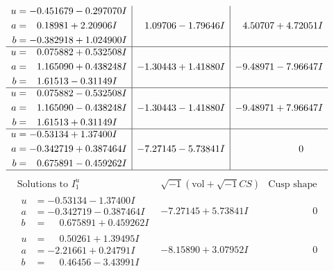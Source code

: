 \documentclass[1p]{elsarticle_modified}
\theoremstyle{definition}
\newcommand{\I}{\sqrt{-1}}
\begin{document}
$$\begin{array}{c|c|c}
\begin{aligned}
u &= -0.451679 - 0.297070 I \\
a &= \phantom{-}0.18981 + 2.20906 I \\
b &= -0.382918 + 1.024900 I\end{aligned}
 & \phantom{-}1.09706 - 1.79646 I & \phantom{-}4.50707 + 4.72051 I \\ \hline\begin{aligned}
u &= \phantom{-}0.075882 + 0.532508 I \\
a &= \phantom{-}1.165090 + 0.438248 I \\
b &= \phantom{-}1.61513 - 0.31149 I\end{aligned}
 & -1.30443 + 1.41880 I & -9.48971 - 7.96647 I \\ \hline\begin{aligned}
u &= \phantom{-}0.075882 - 0.532508 I \\
a &= \phantom{-}1.165090 - 0.438248 I \\
b &= \phantom{-}1.61513 + 0.31149 I\end{aligned}
 & -1.30443 - 1.41880 I & -9.48971 + 7.96647 I \\ \hline\begin{aligned}
u &= -0.53134 + 1.37400 I \\
a &= -0.342719 + 0.387464 I \\
b &= \phantom{-}0.675891 - 0.459262 I\end{aligned}
 & -7.27145 - 5.73841 I & \phantom{-0.000000 } 0\\
 \hline 
 \end{array}$$\newpage$$\begin{array}{c|c|c}  
\text{Solutions to }I^u_{1}& \I (\text{vol} + \sqrt{-1}CS) & \text{Cusp shape}\\
 \hline 
\begin{aligned}
u &= -0.53134 - 1.37400 I \\
a &= -0.342719 - 0.387464 I \\
b &= \phantom{-}0.675891 + 0.459262 I\end{aligned}
 & -7.27145 + 5.73841 I & \phantom{-0.000000 } 0 \\ \hline\begin{aligned}
u &= \phantom{-}0.50261 + 1.39495 I \\
a &= -2.21661 + 0.24791 I \\
b &= \phantom{-}0.46456 - 3.43991 I\end{aligned}
 & -8.15890 + 3.07952 I & \phantom{-0.000000 } 0 \\ \hline\begin{aligned}

\end{aligned}
\end{array}$$
\end{document}
